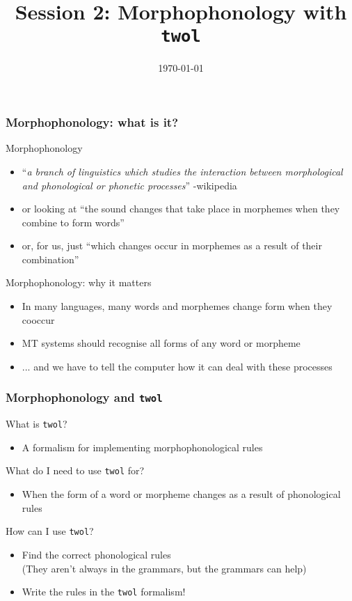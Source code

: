 \documentclass[10pt,xetex]{beamer} %
\date{\today}
\title{Session 2: Morphophonology with \texttt{twol}}
\begin{document}
\begin{frame}
	\frametitle{Morphophonology: what is it?}
	\begin{definition}{Morphophonology}
		\begin{itemize}
			\item ``\textit{a branch of linguistics which studies the interaction between morphological and phonological or phonetic processes}'' -wikipedia
			\item or looking at ``the sound changes that take place in morphemes when they combine to form words''
			\item or, for us, just ``which changes occur in morphemes as a result of their combination''
		\end{itemize}
	\end{definition}
	\begin{block}{Morphophonology: why it matters}
		\begin{itemize}
			\item In many languages, many words and morphemes change form when they cooccur
			\item MT systems should recognise all forms of any word or morpheme
			\item ... and we have to tell the computer how it can deal with these processes
		\end{itemize}
	\end{block}
\end{frame}

\begin{frame}
	\frametitle{Morphophonology and \texttt{twol}}
	\begin{block}{What is \texttt{twol}?}
		\begin{itemize}
			\item A formalism for implementing morphophonological rules
		\end{itemize}
	\end{block}
	\begin{block}{What do I need to use \texttt{twol} for?}
		\begin{itemize}
			\item When the form of a word or morpheme changes as a result of phonological rules
		\end{itemize}
	\end{block}
	\begin{block}{How can I use \texttt{twol}?}
		\begin{itemize}
			\item Find the correct phonological rules\\
			(They aren't always in the grammars, but the grammars can help)
			\item Write the rules in the \texttt{twol} formalism!
		\end{itemize}
	\end{block}

\end{frame}
\end{document}
